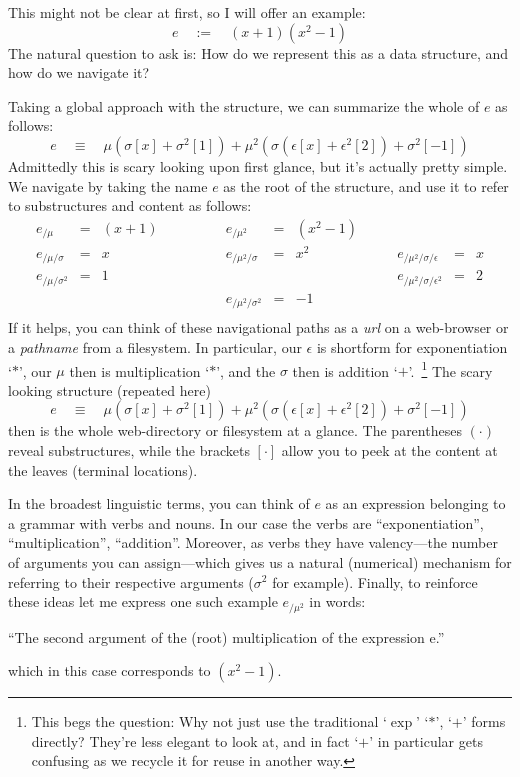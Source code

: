 \documentclass[twoside]{article}
\begin{document}
This might not be clear at first, so I will offer an example:
$$ e\quad:=\quad (x+1)(x^2-1) $$
The natural question to ask is: How do we represent this as a data structure, and how do we navigate it?

Taking a global approach with the structure, we can summarize the whole of $ e $ as follows:
$$ e\quad\equiv\quad \mu(\sigma[x]+\sigma^2[1])+\mu^2(\sigma(\epsilon[x]+\epsilon^2[2])+\sigma^2[-1]) $$
Admittedly this is scary looking upon first glance, but it's actually pretty simple. We navigate by taking
the name $ e $ as the root of the structure, and use it to refer to substructures and content as follows:
$$ \begin{array}{lcllcllcl}
e_{/\mu}			& = & (x+1)	\qquad&\qquad e_{/\mu^2}			& = & (x^2-1)	&		\\
e_{/\mu/\sigma}			& = & x		\qquad&\qquad e_{/\mu^2/\sigma}			& = & x^2	\qquad&\qquad
 e_{/\mu^2/\sigma/\epsilon}	& = & x												\\
e_{/\mu/\sigma^2}		& = & 1		\qquad&\qquad					&   &		\qquad&\qquad
 e_{/\mu^2/\sigma/\epsilon^2}	& = & 2												\\
				&   &		\qquad&\qquad e_{/\mu^2/\sigma^2}		& = & -1	&		\\
\end{array} $$
If it helps, you can think of these navigational paths as a \emph{url} on a web-browser or a \emph{pathname}
from a filesystem. In particular, our $ \epsilon $ is shortform for exponentiation `$ * $', our $ \mu $ then
is multiplication `$ * $', and the $ \sigma $ then is addition `$ + $'.~\footnote{This begs the question: Why
not just use the traditional `$ \exp $' `$ * $', `$ + $' forms directly? They're less elegant to look at, and in fact
`$ + $' in particular gets confusing as we recycle it for reuse in another way.} The scary looking structure (repeated here)
$$ e\quad\equiv\quad \mu(\sigma[x]+\sigma^2[1])+\mu^2(\sigma(\epsilon[x]+\epsilon^2[2])+\sigma^2[-1]) $$
then is the whole web-directory or filesystem at a glance. The parentheses $ (\cdot) $ reveal substructures,
while the brackets $ [\cdot] $ allow you to peek at the content at the leaves (terminal locations).

In the broadest linguistic terms, you can think of $ e $ as an expression belonging to a grammar with verbs and nouns.
In our case the verbs are ``exponentiation'', ``multiplication'', ``addition''. Moreover, as verbs they have valency---the
number of arguments you can assign---which gives us a natural (numerical) mechanism for referring to their respective arguments
($ \sigma^2 $ for example). Finally, to reinforce these ideas let me express one such example $ e_{/\mu^2} $ in words:
\begin{center}
``The second argument of the (root) multiplication of the expression e.''
\end{center}
which in this case corresponds to $ (x^2-1) $.
\end{document}
